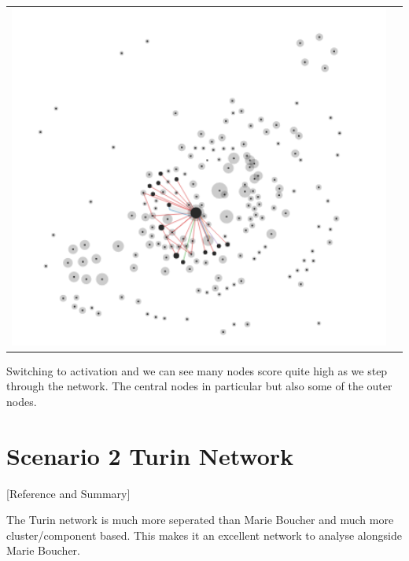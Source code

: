 \begin{center}
\begin{tabular}{cc}
\label{marieBoucherLocalActivationPeriod1}
\includegraphics[trim={0 0 0 0}, width=140mm]{./Figures/marieBoucherLocalActivationPeriod1.png}
\end{tabular}
\end{center} 
Switching to activation and we can see many nodes score quite high as we step through the network. The central nodes in particular but also some of the outer nodes.

\section{Scenario 2 Turin Network}

[Reference and Summary]

The Turin network is much more seperated than Marie Boucher and much more cluster/component based. This makes it an excellent network to analyse alongside Marie Boucher.

